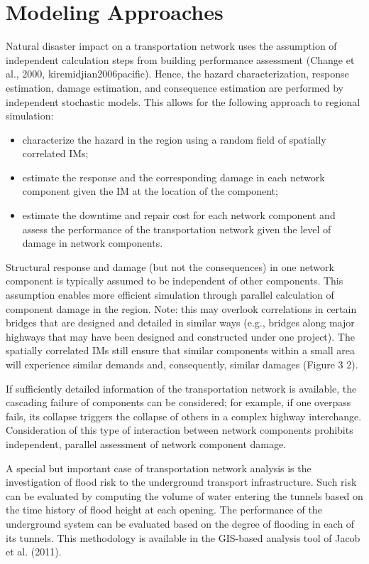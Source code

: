 \section{Modeling Approaches}
\label{sec:perf_transport_methods}

Natural disaster impact on a transportation network uses the assumption of independent calculation steps from building performance assessment (Change et al., 2000, kiremidjian2006pacific). Hence, the hazard characterization, response estimation, damage estimation, and consequence estimation are performed by independent stochastic models. This allows for the following approach to regional simulation:

\begin{itemize}
    \item characterize the hazard in the region using a random field of spatially correlated IMs;
    \item estimate the response and the corresponding damage in each network component given the IM at the location of the component;
    \item estimate the downtime and repair cost for each network component and assess the performance of the transportation network given the level of damage in network components.
\end{itemize}

Structural response and damage (but not the consequences) in one network component is typically assumed to be independent of other components. This assumption enables more efficient simulation through parallel calculation of component damage in the region. Note: this may overlook correlations in certain bridges that are designed and detailed in similar ways (e.g., bridges along major highways that may have been designed and constructed under one project). The spatially correlated IMs still ensure that similar components within a small area will experience similar demands and, consequently, similar damages (Figure 3 2).

If sufficiently detailed information of the transportation network is available, the cascading failure of components can be considered; for example, if one overpass fails, its collapse triggers the collapse of others in a complex highway interchange. Consideration of this type of interaction between network components prohibits independent, parallel assessment of network component damage.

A special but important case of transportation network analysis is the investigation of flood risk to the underground transport infrastructure. Such risk can be evaluated by computing the volume of water entering the tunnels based on the time history of flood height at each opening. The performance of the underground system can be evaluated based on the degree of flooding in each of its tunnels. This methodology is available in the GIS-based analysis tool of Jacob et al. (2011).


